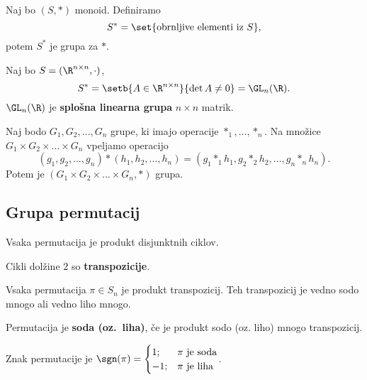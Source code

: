 \begin{zgled}
    Naj bo $(S, *)$ monoid. Definiramo $$S^* = \set{\text{obrnljive elementi iz } S},$$ potem $S^*$ je grupa za $*$.
\end{zgled}

\begin{primer}
    Naj bo $S = (\R^{n \times n}, \cdot)$, $$S^* = \setb{A \in \R^{n \times n}}{\det A \neq 0} = \GL_n(\R).$$ $\GL_n(\R)$ je \textbf{splošna linearna grupa} $n \times n$ matrik.
\end{primer}

\begin{zgled}
    Naj bodo $G_1, G_2, \ldots, G_n$ grupe, ki imajo operacije $*_1, \ldots, *_n$. Na množice $G_1 \times G_2 \times \ldots \times G_n$ vpeljamo operacijo $$(g_1, g_2, \ldots, g_n) * (h_1, h_2, \ldots, h_n) = (g_1 *_1 h_1, g_2 *_2 h_2, \ldots, g_n *_n h_n).$$ Potem je $(G_1 \times G_2 \times \ldots \times G_n, *)$ grupa. 
\end{zgled}

\subsection{Grupa permutacij}
\begin{izrek}
    Vsaka permutacija je produkt disjunktnih ciklov.
\end{izrek}

\begin{definicija}
    Cikli dolžine $2$ so \textbf{transpozicije}.
\end{definicija}

\begin{trditev}
    Vsaka permutacija $\pi \in S_n$ je produkt transpozicij. Teh transpozicij je vedno sodo mnogo ali vedno liho mnogo.
\end{trditev}

\begin{definicija}
    Permutacija je \textbf{soda (oz.\ liha)}, če je produkt sodo (oz. liho) mnogo transpozicij.
\end{definicija}

\begin{definicija}
    Znak permutacije je $\sgn(\pi) = \begin{cases}
        1; &\pi \text{ je soda} \\
        -1; &\pi \text{ je liha}
    \end{cases}$.
\end{definicija}

